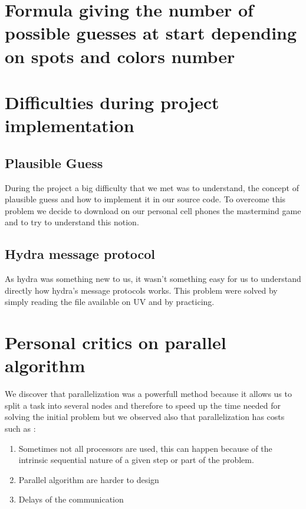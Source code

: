 \section{Formula giving the number of possible guesses at start depending on spots and 
colors number}
\section{Difficulties during project implementation}
\subsection{Plausible Guess}
During the project a big difficulty that we met was to understand, the concept of plausible guess and how to implement it in our source code.  To overcome this problem we decide to download on our personal cell phones the mastermind game and to try to understand this notion.
\subsection{Hydra message protocol}
As hydra was something new to us, it wasn't something easy for us to understand directly how hydra's message protocols works. This problem were solved by simply reading the file available on UV and by practicing. 


\section{Personal critics on parallel algorithm}
We discover that parallelization was a powerfull method because it allows us to split a task into several nodes and therefore to speed up the time needed for solving the initial problem but we observed also that parallelization has costs such as :
\begin{enumerate}
    \item Sometimes not all processors are used, this can happen because of the intrinsic sequential nature of a given step or part of the problem.
    \item Parallel algorithm are harder to design 
    \item Delays of the communication 
\end{enumerate}
